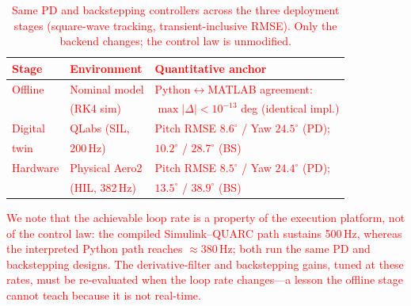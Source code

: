 
\begin{table}[t]
\centering
\caption{\textcolor{red}{Same PD and backstepping controllers across the three
deployment stages (square-wave tracking, transient-inclusive RMSE). Only the
backend changes; the control law is unmodified.}}
\label{tab:stages}
\textcolor{red}{%
\begin{tabular}{@{}lll@{}}
\toprule
\textbf{Stage} & \textbf{Environment} & \textbf{Quantitative anchor} \\
\midrule
Offline & Nominal model & Python$\leftrightarrow$MATLAB agreement: \\
        & (RK4 sim)     & $\max|\Delta|<10^{-13}$ deg (identical impl.) \\[2pt]
Digital & QLabs (SIL,   & Pitch RMSE $8.6^\circ$ / Yaw $24.5^\circ$ (PD); \\
twin    & 200\,Hz)      & $10.2^\circ$ / $28.7^\circ$ (BS) \\[2pt]
Hardware & Physical Aero2 & Pitch RMSE $8.5^\circ$ / Yaw $24.4^\circ$ (PD); \\
         & (HIL, 382\,Hz) & $13.5^\circ$ / $38.9^\circ$ (BS) \\
\bottomrule
\end{tabular}}
\end{table}


\textcolor{red}{We note that the achievable loop rate is a property of the
execution platform, not of the control law: the compiled Simulink--QUARC path
sustains 500\,Hz, whereas the interpreted Python path reaches $\approx$380\,Hz;
both run the same PD and backstepping designs. The derivative-filter and
backstepping gains, tuned at these rates, must be re-evaluated when the loop rate
changes---a lesson the offline stage cannot teach because it is not real-time.}


\textcolor{red}{\caption{Aero2 semester-long design project. The same PD (linear)
and backstepping (nonlinear) controllers are carried, unmodified, from offline
simulation to the QLabs digital twin to physical hardware, and are implemented in
both MATLAB/Simulink--QUARC and Python. Offline the two implementations are
numerically identical; the digital twin and hardware expose platform-dependent
timing and unmodeled coupled dynamics (Table~\ref{tab:stages}).}}
